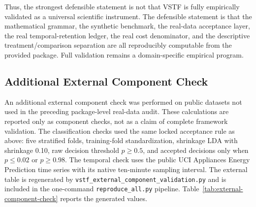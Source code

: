 \documentclass[11pt,a4paper]{article}
\newcommand{\1}{\mathbf{1}}
\begin{document}
Thus, the strongest defensible statement is not that VSTF is fully empirically validated as a universal scientific instrument. The defensible statement is that the mathematical grammar, the synthetic benchmark, the real-data acceptance layer, the real temporal-retention ledger, the real cost denominator, and the descriptive treatment/comparison separation are all reproducibly computable from the provided package. Full validation remains a domain-specific empirical program.

\subsection{Additional External Component Check}

An additional external component check was performed on public datasets not used in the preceding package-level real-data audit. These calculations are reported only as component checks, not as a claim of complete framework validation. The classification checks used the same locked acceptance rule as above: five stratified folds, training-fold standardization, shrinkage LDA with shrinkage 0.10, raw decision threshold $p\geq0.5$, and accepted decisions only when $p\leq0.02$ or $p\geq0.98$. The temporal check uses the public UCI Appliances Energy Prediction time series with its native ten-minute sampling interval. The external table is regenerated by \texttt{vstf\_external\_component\_validation.py} and is included in the one-command \texttt{reproduce\_all.py} pipeline. Table~\ref{tab:external-component-check} reports the generated values.
\end{document}

